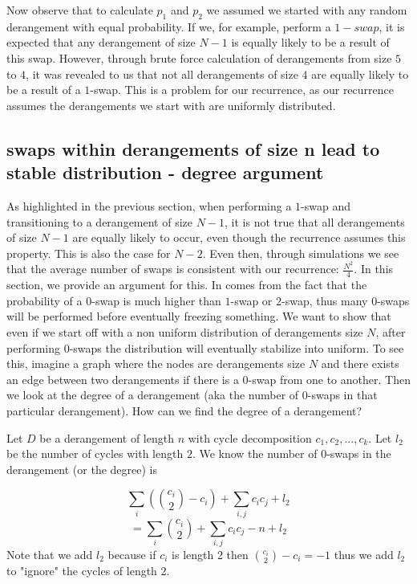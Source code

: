 \documentclass{article}
\begin{document}
Now observe that to calculate $p_1$ and $p_2$ we assumed we started with any random derangement
with equal probability. If we, for example, perform a $1-swap$, it is expected that any 
derangement of size $N - 1$ is equally likely to be a result of this swap. However,
through brute force calculation of derangements from size $5$ to $4$, it was revealed to us that
not all derangements of size $4$ are equally likely to be a result of a $1$-swap. This is a 
problem for our recurrence, as our recurrence assumes the derangements we start with are
uniformly distributed.

\subsection{swaps within derangements of size n lead to stable distribution - degree argument}
As highlighted in the previous section, when performing a $1$-swap and transitioning to a 
derangement of size $N - 1$, it is not true that all derangements of size $N - 1$ are
equally likely to occur, even though the recurrence assumes this property. This is
also the case for $N - 2$. Even then, through simulations we see that the average
number of swaps is consistent with our recurrence: $\frac{N^2}{4}$. In this section, we provide an argument for this.
In comes from the fact that the probability of a $0$-swap is much higher than $1$-swap or $2$-swap, thus
many $0$-swaps will be performed before eventually freezing something. We want to show that even if we start
off with a non uniform distribution of derangements size $N$, after performing $0$-swaps the distribution
will eventually stabilize into uniform. To see this, imagine a graph where the nodes are derangements
size $N$ and there exists an edge between two derangements if there is a $0$-swap from one to another.
Then we look at the degree of a derangement (aka the number of $0$-swaps in that particular derangement).
How can we find the degree of a derangement?

Let $D$ be a derangement of length $n$ with cycle decomposition $c_1, c_2, ..., c_k$.
Let $l_2$ be the number of cycles with length $2$.
We know the number of $0$-swaps in the derangement (or the degree) is

\[
    \sum_{i}{({c_i \choose 2} - c_i)} + \sum_{i, j}{{c_i}{c_j}} + l_2 
\]
\[
    = \sum_{i}{c_i \choose 2} + \sum_{i, j}{{c_i}{c_j}} - n + l_2 
\]
Note that we add $l_2$ because if $c_i$ is length 2 then 
$ {c_i \choose 2} - c_i = -1 $ thus we add $l_2$ to "ignore" the cycles of length 2.
\end{document}
